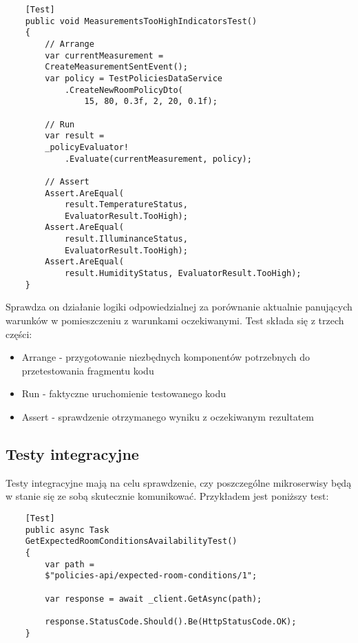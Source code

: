 \begin{lstlisting}
    [Test]
    public void MeasurementsTooHighIndicatorsTest()
    {
        // Arrange
        var currentMeasurement = 
        CreateMeasurementSentEvent();
        var policy = TestPoliciesDataService
            .CreateNewRoomPolicyDto(
                15, 80, 0.3f, 2, 20, 0.1f);

        // Run
        var result = 
        _policyEvaluator!
            .Evaluate(currentMeasurement, policy);
        
        // Assert
        Assert.AreEqual(
            result.TemperatureStatus, 
            EvaluatorResult.TooHigh);
        Assert.AreEqual(
            result.IlluminanceStatus, 
            EvaluatorResult.TooHigh);
        Assert.AreEqual(
            result.HumidityStatus, EvaluatorResult.TooHigh);
    }
\end{lstlisting}

Sprawdza on działanie logiki odpowiedzialnej za porównanie aktualnie panujących 
warunków w pomieszczeniu z warunkami oczekiwanymi. Test składa się z trzech części:

\begin{itemize} %
    \item Arrange - przygotowanie niezbędnych komponentów potrzebnych do przetestowania 
    fragmentu kodu
    \item Run - faktyczne uruchomienie testowanego kodu
    \item Assert - sprawdzenie otrzymanego wyniku z oczekiwanym rezultatem
\end{itemize}

\subsection{Testy integracyjne}

Testy integracyjne mają na celu sprawdzenie, czy poszczególne mikroserwisy będą 
w stanie się ze sobą skutecznie komunikować. Przykładem jest poniższy test:

\begin{lstlisting}
    [Test]
    public async Task 
    GetExpectedRoomConditionsAvailabilityTest()
    {
        var path = 
        $"policies-api/expected-room-conditions/1";
    
        var response = await _client.GetAsync(path);
    
        response.StatusCode.Should().Be(HttpStatusCode.OK);
    }    
\end{lstlisting}

